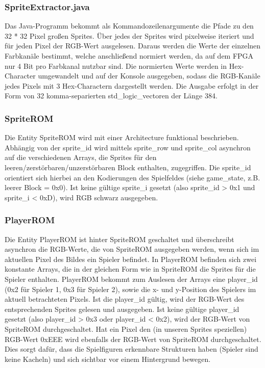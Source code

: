 \documentclass[parskip=full]{scrartcl}
\begin{document}
				\subsubsection{SpriteExtractor.java}
					Das Java-Programm bekommt als Kommandozeilenargumente die Pfade zu den 32 * 32 Pixel großen Sprites. Über jedes der Sprites wird pixelweise iteriert und für jeden Pixel der RGB-Wert ausgelesen. Daraus werden die Werte der einzelnen Farbkanäle bestimmt, welche anschließend normiert werden, da auf dem FPGA nur 4 Bit pro Farbkanal nutzbar sind. Die normierten Werte werden in Hex-Character umgewandelt und auf der Konsole ausgegeben, sodass die RGB-Kanäle jedes Pixels mit 3 Hex-Charactern  dargestellt werden. Die Ausgabe erfolgt in der Form von 32 komma-separierten std\_logic\_vectoren der Länge 384.
				\subsubsection{SpriteROM}
					Die Entity SpriteROM wird mit einer Architecture funktional beschrieben. Abhängig von der sprite\_id wird mittels sprite\_row und sprite\_col asynchron auf die verschiedenen Arrays, die Sprites für den leeren/zerstörbaren/unzerstörbaren Block enthalten, zugegriffen. Die sprite\_id orientiert sich hierbei an den Kodierungen des Spielfeldes (siehe game\_state, z.B. leerer Block = 0x0). Ist keine gültige sprite\_i gesetzt (also sprite\_id > 0x1 und sprite\_i < 0xD), wird RGB schwarz ausgegeben.
				\subsubsection{PlayerROM}
					Die Entity PlayerROM ist hinter SpriteROM geschaltet und überschreibt asynchron die RGB-Werte, die von SpriteROM ausgegeben werden, wenn sich im aktuellen Pixel des Bildes ein Spieler befindet. In PlayerROM befinden sich zwei konstante Arrays, die in der gleichen Form wie in SpriteROM die Sprites für die Spieler enthalten. PlayerROM bekommt zum Auslesen der Arrays eine player\_id (0x2 für Spieler 1, 0x3 für Spieler 2), sowie die x- und y-Position des Spielers im aktuell betrachteten Pixels. Ist die player\_id gültig, wird der RGB-Wert des entsprechenden Sprites gelesen und ausgegeben.
					Ist keine gültige player\_id gesetzt (also player\_id > 0x3 oder player\_id < 0x2), wird der RGB-Wert von SpriteROM durchgeschaltet.
					Hat ein Pixel den (in unseren Sprites speziellen) RGB-Wert 0xEEE wird ebenfalls der RGB-Wert von SpriteROM durchgeschaltet. Dies sorgt dafür, dass die Spielfiguren erkennbare Strukturen haben (Spieler sind keine Kacheln) und sich sichtbar vor einem Hintergrund bewegen.
				
\end{document}
